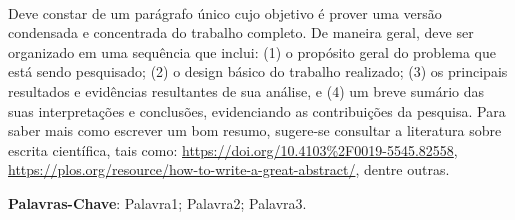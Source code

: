 \ \ \\[2cm]
Deve constar de um parágrafo único cujo objetivo é prover uma versão condensada e concentrada do trabalho completo. De maneira geral, deve ser organizado em uma sequência que inclui: (1) o propósito geral do problema que está sendo pesquisado; (2) o design básico do trabalho realizado; (3) os principais resultados e evidências resultantes de sua análise, e (4) um breve sumário das suas interpretações e conclusões, evidenciando as contribuições da pesquisa. Para saber mais como escrever um bom resumo, sugere-se consultar a literatura sobre escrita científica, tais como: \url{https://doi.org/10.4103%2F0019-5545.82558}, \url{https://plos.org/resource/how-to-write-a-great-abstract/}, dentre outras.





\noindent \textbf{Palavras-Chave}: Palavra1; Palavra2; Palavra3.
